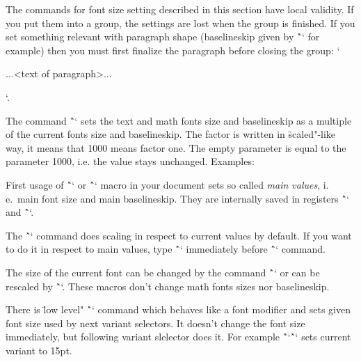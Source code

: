 \begtt
\typosize[10/12]   %
\typosize[11/12.5] %
\typosize[8/]      %
\endtt

The commands for font size setting described in this section
have local validity. If you put them into a group, 
the settings are lost when the group is finished. If you set 
something relevant with paragraph shape (baselineskip given by 
\^`\typosize` for example) then you must first finalize the 
paragraph before closing the group: 
`{\typosize[12/14] ...<text of paragraph>... \par}`. 

The command \^``
sets the text and math fonts
size and baselineskip as a multiple of the current fonts size and
baselineskip. The factor is written in \"scaled"-like way, it means that 1000
means factor one. The empty parameter is equal to the parameter 1000,
i.e. the value stays unchanged. Examples:

\begtt
\typoscale[800/800]    %
\typoscale[\magstep2/] %
\endtt

First usage of \^`\typosize` or \^`\typoscale` macro in your document sets so
called {\em main values}, i.\,e.\ main font size and main baselineskip. They are internally 
saved in registers \^`\mainfosize` and \^`\mainbaselineskip`. 

\new
The \^`\typoscale` command does scaling in respect to current values by default. 
If you want to do it in respect to main values, type \^`\scalemain` immediately
before \^`\typoscale` command.

\begtt
\typosize[12/14.4] %
\typosize[15/18]   %
\scalemain \typoscale[800/800] %
\endtt

The size of the current font can be changed by the command
\^`` or can be rescaled by
\^`\thefontscale[<factor>]`. These macros don't change math fonts sizes nor
baselineskip.

\new
There is \"low level" \^`` command which behaves like
a font modifier and sets given font size used by next variant selectors.
It doesn't change the font size immediately, but following variant slelector
does it. For example \^``\^`\currvar` sets current variant to 15pt.


